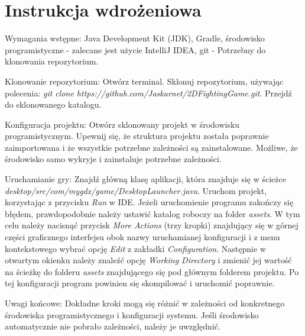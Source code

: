 \chapter{Instrukcja wdrożeniowa}
Wymagania wstępne:
Java Development Kit (JDK), Gradle, środowisko programistyczne - zalecane jest użycie IntelliJ IDEA, git - Potrzebny do klonowania repozytorium.

Klonowanie repozytorium: 
Otwórz terminal. Sklonuj repozytorium, używając polecenia: \emph{git clone https://github.com/Jaskarnet/2DFightingGame.git}. Przejdź do sklonowanego katalogu.

Konfiguracja projektu:
Otwórz sklonowany projekt w środowisku programistycznym. Upewnij się, że struktura projektu została poprawnie zaimportowana i że wszystkie potrzebne zależności są zainstalowane. Możliwe, że środowisko samo wykryje i zainstaluje potrzebne zależności.

Uruchamianie gry:
Znajdź główną klasę aplikacji, która znajduje się w ścieżce \emph{desktop/src/com/mygdx/game/DesktopLauncher.java}. Uruchom projekt, korzystając z przycisku \emph{Run} w IDE. Jeżeli uruchomienie programu zakończy się błędem, prawdopodobnie należy ustawić katalog roboczy na folder \emph{assets}. W tym celu należy nacisnąć przycisk \emph{More Actions} (trzy kropki) znajdujący się w górnej części graficznego interfejsu obok nazwy uruchamianej konfiguracji i z menu kontekstowego wybrać opcję \emph{Edit} z zakładki \emph{Configuration}. Następnie w otwartym okienku należy znaleźć opcję \emph{Working Directory} i zmienić jej wartość na ścieżkę do folderu \emph{assets} znajdującego się pod głównym folderem projektu. Po tej konfiguracji program powinien się skompilować i uruchomić poprawnie.

Uwagi końcowe:
Dokładne kroki mogą się różnić w zależności od konkretnego środowiska programistycznego i konfiguracji systemu. Jeśli środowisko automatycznie nie pobrało zależności, należy je uwzględnić.